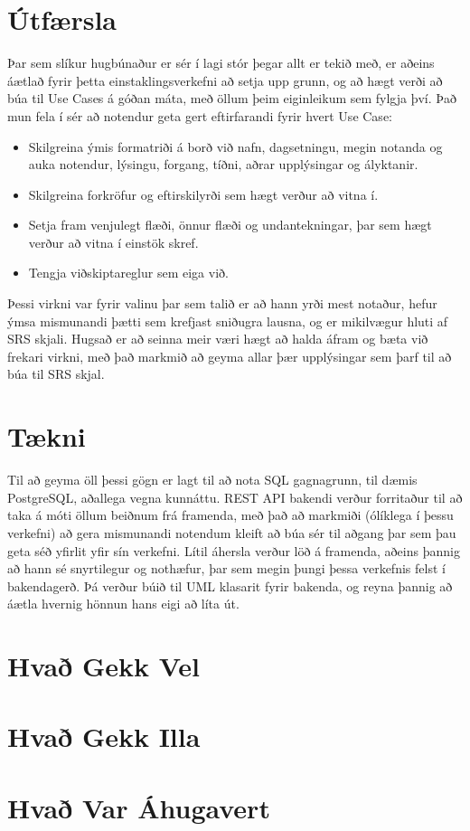 \documentclass[a4paper,11pt]{article}\usepackage[pdftex]{graphicx}\usepackage[]{xcolor}
\begin{document}
\section{Útfærsla}
Þar sem slíkur hugbúnaður er sér í lagi stór þegar allt er tekið með, er aðeins áætlað fyrir þetta einstaklingsverkefni að setja upp grunn, og að hægt verði að búa til Use Cases á góðan máta, með öllum þeim eiginleikum sem fylgja því. Það mun fela í sér að notendur geta gert eftirfarandi fyrir hvert Use Case:
\begin{itemize}
    \item Skilgreina ýmis formatriði á borð við nafn, dagsetningu, megin notanda og auka notendur, lýsingu, forgang, tíðni, aðrar upplýsingar og ályktanir.
    \item Skilgreina forkröfur og eftirskilyrði sem hægt verður að vitna í.
    \item  Setja fram venjulegt flæði, önnur flæði og undantekningar, þar sem hægt verður að vitna í einstök skref.
    \item Tengja viðskiptareglur sem eiga við.
\end{itemize}
Þessi virkni var fyrir valinu þar sem talið er að hann yrði mest notaður, hefur ýmsa mismunandi þætti sem krefjast sniðugra lausna, og er mikilvægur hluti af SRS skjali. Hugsað er að seinna meir væri hægt að halda áfram og bæta við frekari virkni, með það markmið að geyma allar þær upplýsingar sem þarf til að búa til SRS skjal. 

\section{Tækni}
Til að geyma öll þessi gögn er lagt til að nota SQL gagnagrunn, til dæmis PostgreSQL, aðallega vegna kunnáttu. REST API bakendi verður forritaður til að taka á móti öllum beiðnum frá framenda, með það að markmiði (ólíklega í þessu verkefni) að gera mismunandi notendum kleift að búa sér til aðgang þar sem þau geta séð yfirlit yfir sín verkefni. Lítil áhersla verður löð á framenda, aðeins þannig að hann sé snyrtilegur og nothæfur, þar sem megin þungi þessa verkefnis felst í bakendagerð. Þá verður búið til UML klasarit fyrir bakenda, og reyna þannig að áætla hvernig hönnun hans eigi að líta út.

\section{Hvað Gekk Vel}

\section{Hvað Gekk Illa}

\section{Hvað Var Áhugavert}
\end{document}
